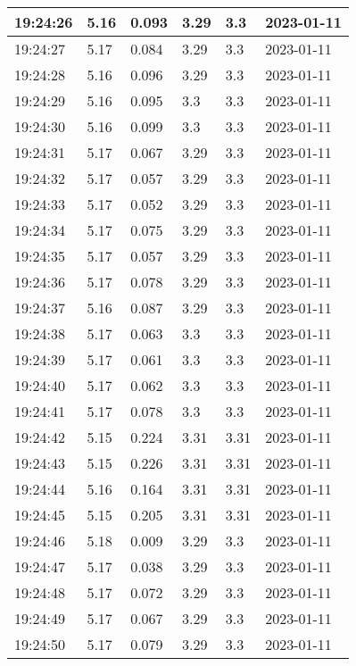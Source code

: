 \begin{longtable}{|l|l|l|l|l|l|}
        19:24:26 & 5.16 & 0.093 & 3.29 & 3.3 & 2023-01-11 \\ \hline
        19:24:27 & 5.17 & 0.084 & 3.29 & 3.3 & 2023-01-11 \\ \hline
        19:24:28 & 5.16 & 0.096 & 3.29 & 3.3 & 2023-01-11 \\ \hline
        19:24:29 & 5.16 & 0.095 & 3.3 & 3.3 & 2023-01-11 \\ \hline
        19:24:30 & 5.16 & 0.099 & 3.3 & 3.3 & 2023-01-11 \\ \hline
        19:24:31 & 5.17 & 0.067 & 3.29 & 3.3 & 2023-01-11 \\ \hline
        19:24:32 & 5.17 & 0.057 & 3.29 & 3.3 & 2023-01-11 \\ \hline
        19:24:33 & 5.17 & 0.052 & 3.29 & 3.3 & 2023-01-11 \\ \hline
        19:24:34 & 5.17 & 0.075 & 3.29 & 3.3 & 2023-01-11 \\ \hline
        19:24:35 & 5.17 & 0.057 & 3.29 & 3.3 & 2023-01-11 \\ \hline
        19:24:36 & 5.17 & 0.078 & 3.29 & 3.3 & 2023-01-11 \\ \hline
        19:24:37 & 5.16 & 0.087 & 3.29 & 3.3 & 2023-01-11 \\ \hline
        19:24:38 & 5.17 & 0.063 & 3.3 & 3.3 & 2023-01-11 \\ \hline
        19:24:39 & 5.17 & 0.061 & 3.3 & 3.3 & 2023-01-11 \\ \hline
        19:24:40 & 5.17 & 0.062 & 3.3 & 3.3 & 2023-01-11 \\ \hline
        19:24:41 & 5.17 & 0.078 & 3.3 & 3.3 & 2023-01-11 \\ \hline
        19:24:42 & 5.15 & 0.224 & 3.31 & 3.31 & 2023-01-11 \\ \hline
        19:24:43 & 5.15 & 0.226 & 3.31 & 3.31 & 2023-01-11 \\ \hline
        19:24:44 & 5.16 & 0.164 & 3.31 & 3.31 & 2023-01-11 \\ \hline
        19:24:45 & 5.15 & 0.205 & 3.31 & 3.31 & 2023-01-11 \\ \hline
        19:24:46 & 5.18 & 0.009 & 3.29 & 3.3 & 2023-01-11 \\ \hline
        19:24:47 & 5.17 & 0.038 & 3.29 & 3.3 & 2023-01-11 \\ \hline
        19:24:48 & 5.17 & 0.072 & 3.29 & 3.3 & 2023-01-11 \\ \hline
        19:24:49 & 5.17 & 0.067 & 3.29 & 3.3 & 2023-01-11 \\ \hline
        19:24:50 & 5.17 & 0.079 & 3.29 & 3.3 & 2023-01-11 \\ \hline

\end{longtable}
